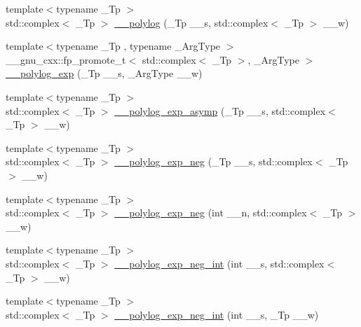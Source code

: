 \begin{DoxyCompactItemize}
\item 
{\footnotesize template$<$typename \+\_\+\+Tp $>$ }\\std\+::complex$<$ \+\_\+\+Tp $>$ \hyperlink{namespacestd_1_1____detail_aa14e3ca6e4bee5ac1f1e5e1c2cee1d5a}{\+\_\+\+\_\+polylog} (\+\_\+\+Tp \+\_\+\+\_\+s, std\+::complex$<$ \+\_\+\+Tp $>$ \+\_\+\+\_\+w)
\item 
{\footnotesize template$<$typename \+\_\+\+Tp , typename \+\_\+\+Arg\+Type $>$ }\\\+\_\+\+\_\+gnu\+\_\+cxx\+::fp\+\_\+promote\+\_\+t$<$ std\+::complex$<$ \+\_\+\+Tp $>$, \+\_\+\+Arg\+Type $>$ \hyperlink{namespacestd_1_1____detail_a0f6f2fc92d4ccec43975a6b9aca9851a}{\+\_\+\+\_\+polylog\+\_\+exp} (\+\_\+\+Tp \+\_\+\+\_\+s, \+\_\+\+Arg\+Type \+\_\+\+\_\+w)
\item 
{\footnotesize template$<$typename \+\_\+\+Tp $>$ }\\std\+::complex$<$ \+\_\+\+Tp $>$ \hyperlink{namespacestd_1_1____detail_af3684fc449da490e9a43985245618a90}{\+\_\+\+\_\+polylog\+\_\+exp\+\_\+asymp} (\+\_\+\+Tp \+\_\+\+\_\+s, std\+::complex$<$ \+\_\+\+Tp $>$ \+\_\+\+\_\+w)
\item 
{\footnotesize template$<$typename \+\_\+\+Tp $>$ }\\std\+::complex$<$ \+\_\+\+Tp $>$ \hyperlink{namespacestd_1_1____detail_a07b26b8c7ff467310e4e1df6e3efd893}{\+\_\+\+\_\+polylog\+\_\+exp\+\_\+neg} (\+\_\+\+Tp \+\_\+\+\_\+s, std\+::complex$<$ \+\_\+\+Tp $>$ \+\_\+\+\_\+w)
\item 
{\footnotesize template$<$typename \+\_\+\+Tp $>$ }\\std\+::complex$<$ \+\_\+\+Tp $>$ \hyperlink{namespacestd_1_1____detail_a313ae48e1c4ed3c5296c8e45614af3d5}{\+\_\+\+\_\+polylog\+\_\+exp\+\_\+neg} (int \+\_\+\+\_\+n, std\+::complex$<$ \+\_\+\+Tp $>$ \+\_\+\+\_\+w)
\item 
{\footnotesize template$<$typename \+\_\+\+Tp $>$ }\\std\+::complex$<$ \+\_\+\+Tp $>$ \hyperlink{namespacestd_1_1____detail_a02b154619b2e4d0bf50dc303370d74cd}{\+\_\+\+\_\+polylog\+\_\+exp\+\_\+neg\+\_\+int} (int \+\_\+\+\_\+s, std\+::complex$<$ \+\_\+\+Tp $>$ \+\_\+\+\_\+w)
\item 
{\footnotesize template$<$typename \+\_\+\+Tp $>$ }\\std\+::complex$<$ \+\_\+\+Tp $>$ \hyperlink{namespacestd_1_1____detail_a7a186c84c1673a2beabba25c91119c66}{\+\_\+\+\_\+polylog\+\_\+exp\+\_\+neg\+\_\+int} (int \+\_\+\+\_\+s, \+\_\+\+Tp \+\_\+\+\_\+w)
\item 

\end{DoxyCompactItemize}

